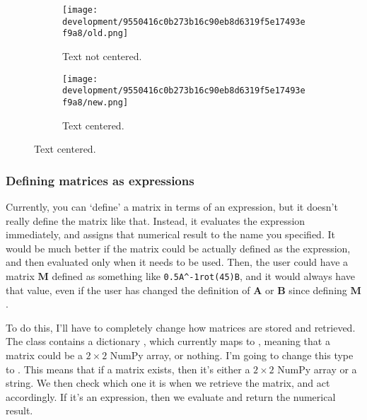 \documentclass[../development.tex]{subfiles}
\begin{document}
\begin{figure}[H]
	\hspace{0.05\linewidth}
	\centering
	\begin{minipage}{0.35\linewidth}
		\centering
		\begin{figure}[H]
			\centering
			\texttt{[image: development/9550416c0b273b16c90eb8d6319f5e17493ef9a8/old.png]}
			\caption{Text not centered.}
			\label{fig:development:9550416c0b273b16c90eb8d6319f5e17493ef9a8:old.png}
		\end{figure}
	\end{minipage}%
	\hspace{0.2\linewidth}
	\begin{minipage}{0.35\linewidth}
		\centering
		\begin{figure}[H]
			\centering
			\texttt{[image: development/9550416c0b273b16c90eb8d6319f5e17493ef9a8/new.png]}
			\caption{Text centered.}
			\label{fig:development:9550416c0b273b16c90eb8d6319f5e17493ef9a8:new.png}
		\end{figure}
	\end{minipage}
	\hspace{0.05\linewidth}
	\vspace{-1em}
\end{figure}

\subsubsection{Defining matrices as expressions\label{development:fixing-bugs-and-adding-polish:defining-matrices-as-expressions}}

Currently, you can \enquote*{define} a matrix in terms of an expression, but it doesn't really define the matrix like that. Instead, it evaluates the expression immediately, and assigns that numerical result to the name you specified. It would be much better if the matrix could be actually defined as the expression, and then evaluated only when it needs to be used. Then, the user could have a matrix $\mathbf{M}$ defined as something like \texttt{0.5A\^{}-1rot(45)B}, and it would always have that value, even if the user has changed the definition of $\mathbf{A}$ or $\mathbf{B}$ since defining $\mathbf{M}$.

To do this, I'll have to completely change how matrices are stored and retrieved. The  class contains a dictionary , which currently maps  to , meaning that a matrix could be a $2 \times 2$ NumPy array, or nothing. I'm going to change this type to . This means that if a matrix exists, then it's either a $2 \times 2$ NumPy array or a string. We then check which one it is when we retrieve the matrix, and act accordingly. If it's an expression, then we evaluate and return the numerical result.
\end{document}
